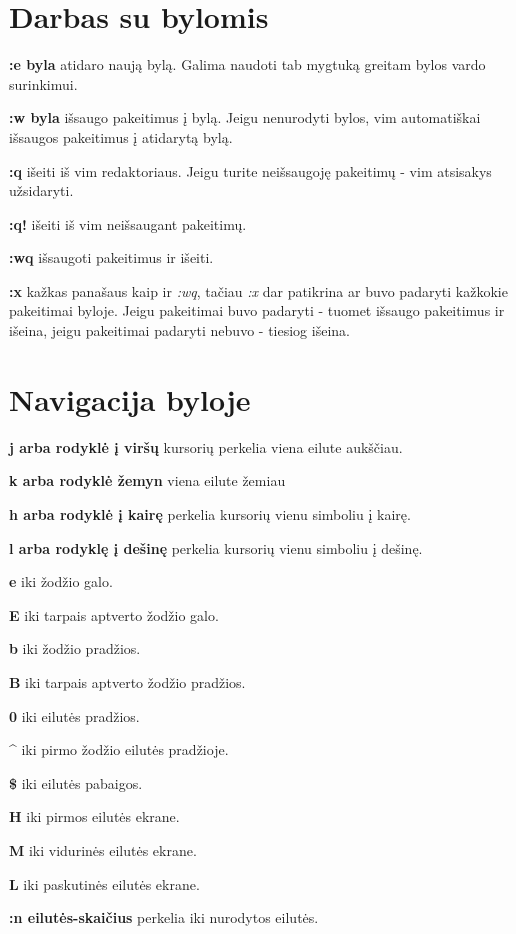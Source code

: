 \documentclass[11pt,a4paper]{article}
\begin{document}
\pagestyle{empty}

  \section{Darbas su bylomis}

  \begin{multicols}{2}
    
    \textbf{:e byla} atidaro naują bylą. Galima naudoti tab mygtuką
    greitam bylos vardo surinkimui.
    
    \textbf{:w byla} išsaugo pakeitimus į bylą. Jeigu nenurodyti
    bylos, vim automatiškai išsaugos pakeitimus į atidarytą bylą.

    \textbf{:q} išeiti iš vim redaktoriaus. Jeigu turite
    neišsaugoję pakeitimų - vim atsisakys užsidaryti.

    \textbf{:q!} išeiti iš vim neišsaugant pakeitimų.

    \textbf{:wq} išsaugoti pakeitimus ir išeiti.

    \textbf{:x} kažkas panašaus kaip ir \textsl{:wq}, tačiau
    \textsl{:x} dar patikrina ar buvo padaryti kažkokie pakeitimai
    byloje. Jeigu pakeitimai buvo padaryti - tuomet išsaugo pakeitimus
    ir išeina, jeigu pakeitimai padaryti nebuvo - tiesiog išeina.

  \end{multicols}

  \section{Navigacija byloje}

  \begin{multicols}{2}

    \textbf{j arba rodyklė į viršų} kursorių perkelia viena eilute
    aukščiau.

    \textbf{k arba rodyklė žemyn} viena eilute žemiau

    \textbf{h arba rodyklė į kairę} perkelia kursorių vienu simboliu į
    kairę.

    \textbf{l arba rodyklę į dešinę} perkelia kursorių vienu
    simboliu į dešinę.

    \textbf{e} iki žodžio galo.

    \textbf{E} iki tarpais aptverto žodžio galo.

    \textbf{b} iki žodžio pradžios.

    \textbf{B} iki tarpais aptverto žodžio pradžios.

    \textbf{0} iki eilutės pradžios.

    \textbf{\^{}} iki pirmo žodžio eilutės pradžioje.

    \textbf{\$} iki eilutės pabaigos.

    \textbf{H} iki pirmos eilutės ekrane.

    \textbf{M} iki vidurinės eilutės ekrane.
    
    \textbf{L} iki paskutinės eilutės ekrane.

    \textbf{:n eilutės-skaičius} perkelia iki nurodytos eilutės. 

  \end{multicols}
\end{document}

